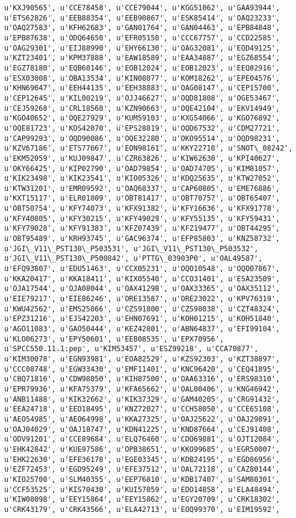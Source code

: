 \documentclass[11pt]{article}
\begin{document}
\begin{Verbatim}[commandchars=\\\{\}]
u'KXJ90565', u'CCE78458', u'CCE79044', u'KGG51062', u'GAA93944', u'ETS62826', u'EEB88354', u'EEB90867', u'ESK85414', u'OAQ23233', u'OAQ27583', u'KFH62683', u'GAN01764', u'GAN04463', u'EPB84848', u'EPB87638', u'ODQ64650', u'EFR05150', u'CCC67757', u'CCD22585', u'OAG29301', u'EIJ88990', u'EHY66130', u'OAG32081', u'EOD49125', u'KZT23401', u'KPM37888', u'EAW18589', u'EAA34887', u'EGZ68554', u'EGZ78180', u'EQB60146', u'EOB12024', u'EOB12023', u'EEQ82916', u'ESX03008', u'OBA13534', u'KIN08077', u'KOM18262', u'EPE04576', u'KHN69647', u'EEH44135', u'EEH38883', u'OAG08147', u'CEP15700', u'CEP12645', u'KIL00219', u'OJJ46627', u'OQD81808', u'OGE53467', u'CEJ59268', u'CRL18560', u'KZN90663', u'OQE42104', u'EKV14949', u'KGO40652', u'OQE27929', u'KUM59103', u'KXG54066', u'KGO76892', u'OQE81723', u'KOS42070', u'EPS28819', u'OQD67532', u'CDM27721', u'CAP99293', u'OQD90086', u'OQE32280', u'OKO95514', u'OQD98231', u'KZV67186', u'ETS77667', u'EON98161', u'KKY22710', u'SNOT\_08242', u'EKM52059', u'KUJ09847', u'CZR63826', u'KIW62630', u'KPI40627', u'OKY66425', u'KIP02790', u'OAD79854', u'OAD74705', u'KIM81057', u'KIK23498', u'KIK23541', u'KIO05326', u'KDQ25635', u'KTW27052', u'KTW31201', u'EMR09592', u'OAQ68337', u'CAP60805', u'EME76886', u'KXT15117', u'ELR01809', u'OBT81417', u'OBT70757', u'OBT65407', u'OBT50754', u'KFY74073', u'KFX91382', u'KFY16636', u'KFX91778', u'KFY40805', u'KFY30215', u'KFY49029', u'KFY55135', u'KFY59431', u'KFY79028', u'KFY91383', u'KFZ07439', u'KFZ19477', u'OBT44295', u'OBT95489', u'KRH93745', u'GAC96374', u'EFP85803', u'KNZ58732', u'JGI\_V11\_PST130\_P503531', u'JGI\_V11\_PST130\_P503532', u'JGI\_V11\_PST130\_P500842', u'PTTG\_03903P0', u'OAL49587', u'EFQ93807', u'EDU51463', u'CCX05231', u'OQO10548', u'OQO07867', u'KKA20417', u'KKA18411', u'KIX05540', u'CCO31401', u'ESA23509', u'OJA17544', u'OJA08044', u'OAX41298', u'OAX33365', u'OAX35112', u'EIE79217', u'EIE86246', u'ORE13587', u'ORE23022', u'KPV76319', u'KWU42562', u'EMS25866', u'CZS91800', u'CZS98038', u'CZT48324', u'EPZ31216', u'EJS42203', u'EHN07691', u'KOH01215', u'KOH51840', u'AGO11083', u'GAO50444', u'KEZ42801', u'ABN64837', u'EFI99104', u'KLO06273', u'EPY50601', u'EEB08535', u'EPX70956', u'SPCC550.11.1:pep', u'KIM53457', u'ESZ99218', u'CCA70877', u'KIM30078', u'EGN93981', u'EOA82529', u'KZS92303', u'KZT38897', u'CCC08748', u'EGW33430', u'EMF11401', u'KNC96420', u'CEQ41895', u'CBQ71816', u'CDW98050', u'KIH87500', u'OAA63316', u'ERS98310', u'EPR79936', u'KFA75379', u'KFA65662', u'OAL00406', u'KNG46942', u'ANB11488', u'KIK32662', u'KIK37329', u'GAM40205', u'CRG91432', u'EEA24718', u'EED18495', u'KNZ72027', u'CCH58050', u'CCE65108', u'AEO54985', u'AEO64998', u'KKA27325', u'OAJ25622', u'OAJ29891', u'OAJ04029', u'OAJ18747', u'KDN41225', u'KND87664', u'CEJ91408', u'ODV91201', u'CCE89684', u'ELQ76460', u'CDO69881', u'OJT12084', u'EHK42842', u'KUE97586', u'OPB38651', u'KKO99685', u'EGR50007', u'EHK22630', u'EFE36178', u'EGE03345', u'KDB24195', u'EGD86956', u'EZF72453', u'EGD95249', u'EFE37512', u'OAL72118', u'CAZ80144', u'KIO25700', u'SLM40355', u'EEP76810', u'KDB17407', u'SAM80301', u'CCF53525', u'KIS70430', u'KUI57059', u'EDO14858', u'ELA48494', u'KIW08098', u'EEY15864', u'EEY15862', u'EGY20709', u'CRK18302', u'CRK43179', u'CRK43566', u'ELA42713', u'EOQ99370', u'EIM19592', 
\end{Verbatim}
\end{document}
